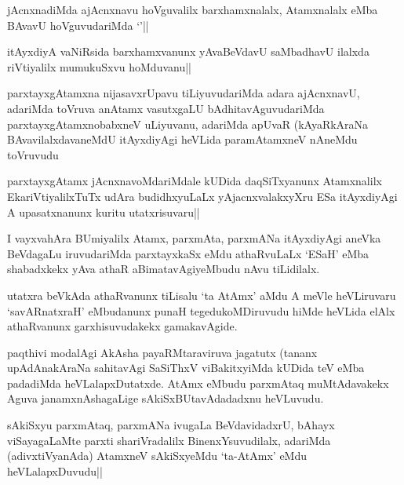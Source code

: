 \begin{artha}
jAcnxnadiMda ajAcnxnavu hoVguvalilx barxhamxnalalx, Atamxnalalx eMba BAvavU hoVguvudariMda `\stext '||

itAyxdiyA vaNiRsida barxhamxvanunx yAvaBeVdavU saMbadhavU ilalxda riVtiyalilx mumukuSxvu hoMduvanu||
\end{artha}

\begin{artha}
parxtayxgAtamxna nijasavxrUpavu tiLiyuvudariMda adara ajAcnxnavU, adariMda toVruva anAtamx vasutxgaLU bAdhitavAguvudariMda parxtayxgAtamxnobabxneV uLiyuvanu, adariMda apUvaR (kAyaRkAraNa BAvavilalxdavaneMdU itAyxdiyAgi heVLida paramAtamxneV nAneMdu toVruvudu 
\end{artha}

\begin{artha}%
parxtayxgAtamx jAcnxnavoMdariMdale kUDida daqSiTxyanunx Atamxnalilx EkariVtiyalilxTuTx udAra budidhxyuLaLx yAjacnxvalakxyXru ESa itAyxdiyAgi A upasatxnanunx kuritu utatxrisuvaru||
\end{artha}


\begin{artha}
I vayxvahAra BUmiyalilx Atamx, parxmAta, parxmANa itAyxdiyAgi aneVka BeVdagaLu iruvudariMda parxtayxkaSx eMdu athaRvuLaLx `ESaH' eMba shabadxkekx yAva athaR aBimatavAgiyeMbudu nAvu tiLidilalx.
\end{artha}

\begin{artha}
utatxra beVkAda athaRvanunx tiLisalu `ta AtAmx' aMdu A meVle heVLiruvaru `savARnatxraH' eMbudanunx punaH tegedukoMDiruvudu hiMde heVLida elAlx athaRvanunx garxhisuvudakekx gamakavAgide.
\end{artha}


\begin{artha}
paqthivi modalAgi AkAsha payaRMtaraviruva jagatutx (tananx upAdAnakAraNa sahitavAgi SaSiThxV viBakitxyiMda kUDida teV eMba padadiMda heVLalapxDutatxde. AtAmx eMbudu parxmAtaq muMtAdavakekx Aguva janamxnAshagaLige sAkiSxBUtavAdadadxnu heVLuvudu. 
\end{artha}


\begin{artha}
sAkiSxyu parxmAtaq, parxmANa ivugaLa BeVdavidadxrU, bAhayx viSayagaLaMte parxti shariVradalilx BinenxYsuvudilalx, adariMda (adivxtiVyanAda) AtamxneV sAkiSxyeMdu `ta-AtAmx' eMdu heVLalapxDuvudu||
\end{artha}

